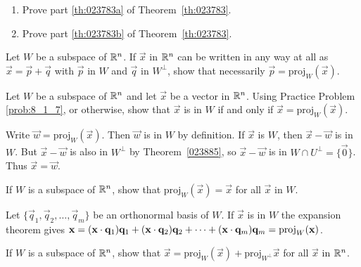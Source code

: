 \documentclass{ximera}
\begin{document}
\begin{problem}\label{prob:8_1_6}
\begin{enumerate}
\item Prove part \ref{th:023783a} of Theorem~\ref{th:023783}.

\item Prove part \ref{th:023783b} of Theorem~\ref{th:023783}.

\end{enumerate}
\end{problem}

\begin{problem} \label{prob:8_1_7}
Let $W$ be a subspace of $\mathbb{R}^n$. If $\vec{x}$ in $\mathbb{R}^n$ can be written in any way at all as $\vec{x} = \vec{p} + \vec{q}$ with $\vec{p}$ in $W$ and $\vec{q}$ in $W^\perp$, show that necessarily $\vec{p} = \mbox{proj}_W(\vec{x})$.
\end{problem}

\begin{problem}\label{prob:8_1_8}
Let $W$ be a subspace of $\mathbb{R}^n$ and let $\vec{x}$ be a vector in $\mathbb{R}^n$. Using Practice Problem \ref{prob:8_1_7}, or otherwise, show that $\vec{x}$ is in $W$ if and only if $\vec{x} = \mbox{proj}_W(\vec{x})$.

\begin{hint}
Write $\vec{w} = \mbox{proj}_W(\vec{x})$. Then $\vec{w}$ is in $W$ by definition. If $\vec{x}$ is $W$, then $\vec{x} - \vec{w}$ is in $W$. But $\vec{x} - \vec{w}$ is also in $W^\perp$ by Theorem~\ref{023885}, so $\vec{x} - \vec{w}$ is in $W \cap U^\perp = \{\vec{0}\}$. Thus $\vec{x} = \vec{w}$.
\end{hint}
\end{problem}


\begin{problem}\label{prob:8_1_10}
If $W$ is a subspace of $\mathbb{R}^n$, show that $\mbox{proj}_W(\vec{x}) = \vec{x}$ for all $\vec{x}$ in $W$.

\begin{hint}
Let $\{\vec{q}_{1}, \vec{q}_{2}, \dots , \vec{q}_{m}\}$ be an orthonormal basis of $W$. If $\vec{x}$ is in $W$ the expansion theorem gives $\mathbf{x} = (\mathbf{x} \cdot \mathbf{q}_{1})\mathbf{q}_{1} + (\mathbf{x} \cdot \mathbf{q}_{2})\mathbf{q}_{2} + \dots  + (\mathbf{x} \cdot \mathbf{q}_{m})\mathbf{q}_{m} = \mbox{proj}_W(\mathbf{x})$.
\end{hint}
\end{problem}

\begin{problem}\label{prob:8_1_11}
If $W$ is a subspace of $\mathbb{R}^n$, show that $\vec{x} = \mbox{proj}_W(\vec{x}) + \mbox{proj}_{W^\perp}\vec{x}$ for all $\vec{x}$ in $\mathbb{R}^n$.
\end{problem}
\end{document}
